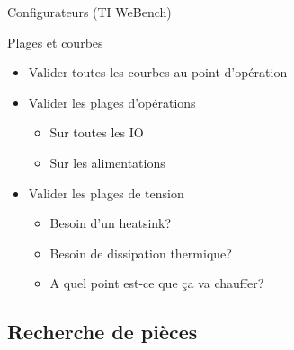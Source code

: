 \begin{frame}{Configurateurs (TI WeBench)}
\end{frame}

\begin{frame}{Plages et courbes}
    \begin{twocolumns}
        \leftcol
        \begin{itemize}
            \item Valider toutes les courbes au point d'opération
            \item Valider les plages d'opérations
            \begin{itemize}
                \item Sur toutes les IO
                \item Sur les alimentations
            \end{itemize}
        \end{itemize}
        \rightcol
        \begin{itemize}
            \item Valider les plages de tension
            \begin{itemize}
                \item Besoin d'un heatsink?
                \item Besoin de dissipation thermique?
                \item A quel point est-ce que ça va chauffer?
            \end{itemize}
        \end{itemize}
    \end{twocolumns}

\end{frame}

\subsection{Recherche de pièces}

